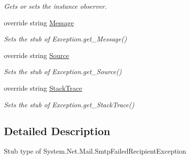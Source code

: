 \begin{DoxyCompactItemize}
\begin{DoxyCompactList}\small\item\em Gets or sets the instance observer.\end{DoxyCompactList}\item 
override string \hyperlink{class_system_1_1_net_1_1_mail_1_1_fakes_1_1_stub_smtp_failed_recipient_exception_a2729d3cc1992c3ecb209109071fd1b7e}{Message}
\begin{DoxyCompactList}\small\item\em Sets the stub of Exception.\-get\-\_\-\-Message()\end{DoxyCompactList}\item 
override string \hyperlink{class_system_1_1_net_1_1_mail_1_1_fakes_1_1_stub_smtp_failed_recipient_exception_a6806ecd6f7f72d27a44ee9a33fa72ae8}{Source}
\begin{DoxyCompactList}\small\item\em Sets the stub of Exception.\-get\-\_\-\-Source()\end{DoxyCompactList}\item 
override string \hyperlink{class_system_1_1_net_1_1_mail_1_1_fakes_1_1_stub_smtp_failed_recipient_exception_aa54358a8921c6ffe9e651cb480e65c73}{Stack\-Trace}
\begin{DoxyCompactList}\small\item\em Sets the stub of Exception.\-get\-\_\-\-Stack\-Trace()\end{DoxyCompactList}\end{DoxyCompactItemize}


\subsection{Detailed Description}
Stub type of System.\-Net.\-Mail.\-Smtp\-Failed\-Recipient\-Exception



